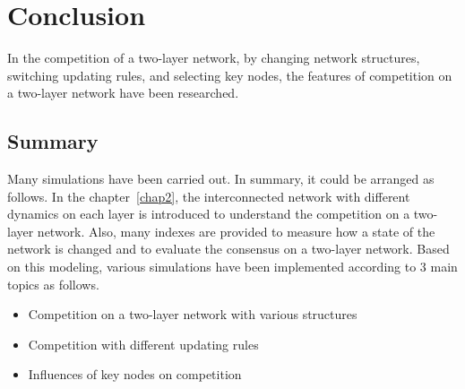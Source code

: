 
\chapter{Conclusion}
\label{chap6}
In the competition of a two-layer network, by changing network structures, switching updating rules, and selecting key nodes, the features of competition on a two-layer network have been researched.\\
 
\section{Summary}
Many simulations have been carried out. In summary, it could be arranged as follows. 
In the chapter~\ref{chap2}, the interconnected network with different dynamics on each layer is introduced to understand the competition on a two-layer network.  Also, many indexes are provided to measure how a state of the network is changed and to evaluate the consensus on a two-layer network. Based on this modeling, various simulations have been implemented according to 3 main topics as follows.

\begin{itemize}
\item Competition on a two-layer network with various structures
\item Competition with different updating rules
\item Influences of key nodes on competition
\end{itemize}


